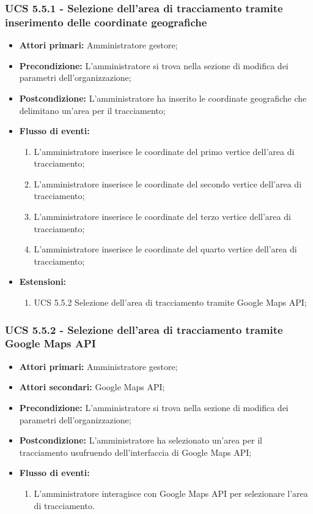 \subsubsection{UCS 5.5.1 - Selezione dell'area di tracciamento tramite inserimento delle coordinate geografiche}%
\begin{itemize}
\item \textbf{Attori primari:} Amministratore gestore;
\item \textbf{Precondizione:} L'amministratore si trova nella sezione di modifica dei parametri dell'organizzazione;
\item \textbf{Postcondizione:} L'amministratore ha inserito le coordinate geografiche che delimitano un'area per il tracciamento;
\item \textbf{Flusso di eventi:}
\begin{enumerate}
    \item L'amministratore inserisce le coordinate del primo vertice dell'area di tracciamento;
    \item L'amministratore inserisce le coordinate del secondo vertice dell'area di tracciamento;
    \item L'amministratore inserisce le coordinate del terzo vertice dell'area di tracciamento;
    \item L'amministratore inserisce le coordinate del quarto vertice dell'area di tracciamento;
\end{enumerate}
\item \textbf{Estensioni:}
\begin{enumerate}
    \item UCS 5.5.2 Selezione dell'area di tracciamento tramite Google Maps API;
\end{enumerate}
\end{itemize}

\subsubsection{UCS 5.5.2 - Selezione dell'area di tracciamento tramite Google Maps API}%
\begin{itemize}
\item \textbf{Attori primari:} Amministratore gestore;
\item \textbf{Attori secondari:} Google Maps API;
\item \textbf{Precondizione:} L'amministratore si trova nella sezione di modifica dei parametri dell'organizzazione;
\item \textbf{Postcondizione:} L'amministratore ha selezionato un'area per il tracciamento usufruendo dell'interfaccia di Google Maps API;
\item \textbf{Flusso di eventi:}
\begin{enumerate}
    \item L'amministratore interagisce con Google Maps API per selezionare l'area di tracciamento.
\end{enumerate}
\end{itemize}